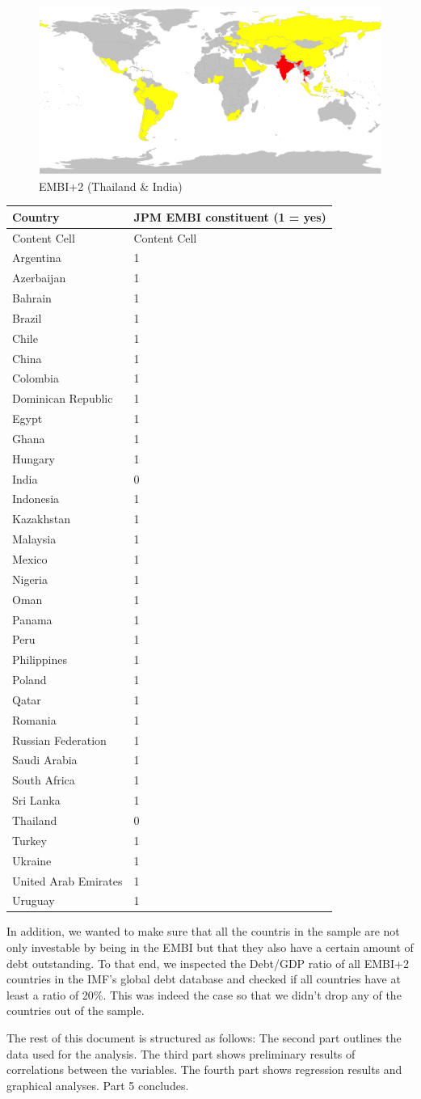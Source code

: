 \documentclass[11pt,]{article}
\begin{document}
\begin{figure}
\centering
\includegraphics{reportfigures/EMBI+2.png}
\caption{EMBI+2 (Thailand \& India)}
\end{figure}

\begin{longtable}[]{@{}ll@{}}
\toprule
Country & JPM EMBI constituent (1 = yes)\tabularnewline
\midrule
\endhead
Content Cell & Content Cell\tabularnewline
Argentina & 1\tabularnewline
Azerbaijan & 1\tabularnewline
Bahrain & 1\tabularnewline
Brazil & 1\tabularnewline
Chile & 1\tabularnewline
China & 1\tabularnewline
Colombia & 1\tabularnewline
Dominican Republic & 1\tabularnewline
Egypt & 1\tabularnewline
Ghana & 1\tabularnewline
Hungary & 1\tabularnewline
India & 0\tabularnewline
Indonesia & 1\tabularnewline
Kazakhstan & 1\tabularnewline
Malaysia & 1\tabularnewline
Mexico & 1\tabularnewline
Nigeria & 1\tabularnewline
Oman & 1\tabularnewline
Panama & 1\tabularnewline
Peru & 1\tabularnewline
Philippines & 1\tabularnewline
Poland & 1\tabularnewline
Qatar & 1\tabularnewline
Romania & 1\tabularnewline
Russian Federation & 1\tabularnewline
Saudi Arabia & 1\tabularnewline
South Africa & 1\tabularnewline
Sri Lanka & 1\tabularnewline
Thailand & 0\tabularnewline
Turkey & 1\tabularnewline
Ukraine & 1\tabularnewline
United Arab Emirates & 1\tabularnewline
Uruguay & 1\tabularnewline
\bottomrule
\end{longtable}

In addition, we wanted to make sure that all the countris in the sample
are not only investable by being in the EMBI but that they also have a
certain amount of debt outstanding. To that end, we inspected the
Debt/GDP ratio of all EMBI+2 countries in the IMF's global debt database
and checked if all countries have at least a ratio of 20\%. This was
indeed the case so that we didn't drop any of the countries out of the
sample.

The rest of this document is structured as follows: The second part
outlines the data used for the analysis. The third part shows
preliminary results of correlations between the variables. The fourth
part shows regression results and graphical analyses. Part 5 concludes.
\end{document}
